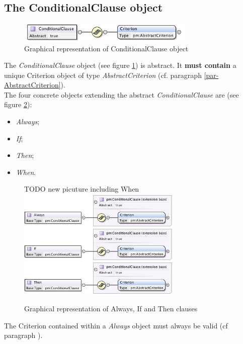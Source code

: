 \documentclass[a4paper,11pt] {ivoa}
\begin{document}
\subsection{The ConditionalClause object}\label{par-ConditionalClause}
\begin{figure}[htbp]
\begin{center}
\includegraphics[width=0.75\textwidth]{pictures/ConditionalClause.jpg} 
\caption{Graphical representation of ConditionalClause object}
\label{Pic-ConditionalClause}
\end{center}
\end{figure}
The {\it ConditionalClause} object (see figure \ref{Pic-ConditionalClause}) is abstract. It {\bf
must contain} a unique Criterion object of type {\it AbstractCriterion} (cf. paragraph
\ref{par-AbstractCriterion}).\\
The four concrete objects extending the abstract {\it ConditionalClause} are (see figure
\ref{Pic-ConcreteClause}):
\begin{itemize}
\item {\it Always};
\item {\it If};
\item {\it Then};
\item {\it When}.
\end{itemize}
\begin{figure}[htbp]
\begin{center}
TODO new picuture including When
\includegraphics[width=0.7\textwidth]{pictures/ConcreteClauses.jpg} 
\caption{Graphical representation of Always, If and Then clauses}
\label{Pic-ConcreteClause}
\end{center}
\end{figure}
The Criterion contained within a {\it Always} object must always be valid (cf paragraph
\label{par-AlwaysConditionalStatement}).\\
\end{document}
